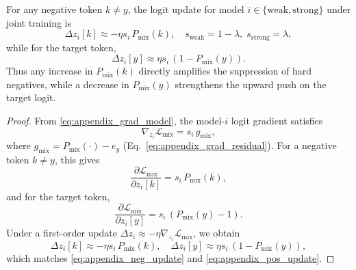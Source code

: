 \begin{proposition}
For any negative token $k \neq y$, the logit update for model $i \in \{\mathrm{weak}, \mathrm{strong}\}$ under joint training is
\begin{equation}
    \Delta z_i[k] \approx -\eta s_i \, P_{\mathrm{mix}}(k), \quad s_{\mathrm{weak}} = 1-\lambda,\; s_{\mathrm{strong}} = \lambda,
    \label{eq:appendix_neg_update}
\end{equation}
while for the target token,
\begin{equation}
    \Delta z_i[y] \approx \eta s_i \, (1 - P_{\mathrm{mix}}(y)).
    \label{eq:appendix_pos_update}
\end{equation}
Thus any increase in $P_{\mathrm{mix}}(k)$ directly amplifies the suppression of hard negatives, while a decrease in $P_{\mathrm{mix}}(y)$ strengthens the upward push on the target logit.
\end{proposition}
\begin{proof}
From \eqref{eq:appendix_grad_model}, the model-$i$ logit gradient satisfies
\begin{equation}
    \nabla_{z_i} \mathcal{L}_{\mathrm{mix}} = s_i \, g_{\text{mix}},
    \label{eq:appendix_prop_grad}
\end{equation}
where $g_{\text{mix}} = P_{\mathrm{mix}}(\cdot) - e_y$ (Eq.~\eqref{eq:appendix_grad_residual}).
For a negative token $k \neq y$, this gives
\begin{equation}
    \frac{\partial \mathcal{L}_{\mathrm{mix}}}{\partial z_i[k]} = s_i \, P_{\mathrm{mix}}(k),
    \label{eq:appendix_prop_neg_grad}
\end{equation}
and for the target token,
\begin{equation}
    \frac{\partial \mathcal{L}_{\mathrm{mix}}}{\partial z_i[y]} = s_i \, (P_{\mathrm{mix}}(y) - 1).
    \label{eq:appendix_prop_pos_grad}
\end{equation}
Under a first-order update $\Delta z_i \approx -\eta \nabla_{z_i}\mathcal{L}_{\mathrm{mix}}$, we obtain
\begin{equation}
    \Delta z_i[k] \approx -\eta s_i \, P_{\mathrm{mix}}(k),
    \quad
    \Delta z_i[y] \approx \eta s_i \, (1 - P_{\mathrm{mix}}(y)),
    \label{eq:appendix_prop_update}
\end{equation}
which matches \eqref{eq:appendix_neg_update} and \eqref{eq:appendix_pos_update}.
\end{proof}

